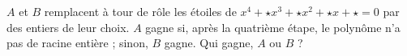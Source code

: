 $A$ et $B$ remplacent à tour de rôle les étoiles de $x^4 + {\star}x^3 + {\star}x^2 + {\star}x + {\star} = 0$ par des entiers de leur choix. $A$ gagne si, après la quatrième étape, le polynôme n'a pas de racine entière ; sinon, $B$ gagne. Qui gagne, $A$ ou $B$ ?
